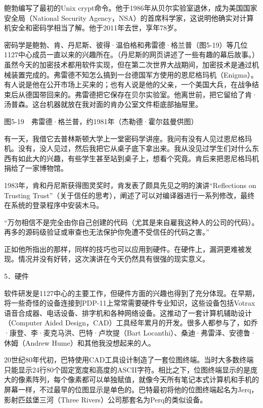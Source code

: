 \documentclass[a4paper,12pt,UTF8,twoside]{ctexbook}
\begin{document}
{{鲍勃编写了最初的Unix crypt命令。他于1986年从贝尔实验室退休，成为美国国家安全局（National Security Agency，NSA）的首席科学家，这说明他确实对计算机安全和密码学相当了解。他于2011年去世，享年78岁。

密码学是鲍勃、肯、丹尼斯、彼得·温伯格和弗雷德·格兰普（图5-19）等几位1127中心成员一直以来的兴趣所在。（丹尼斯的网页讲述了一些有趣的幕后故事。）虽然今天的加密技术都用软件实现，但在第二次世界大战期间，加密技术是通过机械装置完成的。弗雷德不知怎么搞到一台德国军方使用的恩尼格玛机（Enigma）。有人说是他在公开市场上买来的；也有人说是他的父亲，一个美国大兵，在战争结束后从德国带回来的。弗雷德把它保存在贝尔实验室。他离世前，把它留给了肯·汤普森。这台机器就放在我对面的肯办公室文件柜底部抽屉里。



图5-19　弗雷德·格兰普，约1981年（杰勒德·霍尔兹曼供图）

有一天，我借它去普林斯顿大学上一堂密码学讲座。我问有没有人见过恩尼格玛机。没有，没人见过，然后我把它从桌子底下拿出来。我从没见过学生们对什么东西有如此大的兴趣，有些学生甚至站到桌子上，想看个究竟。肯后来把恩尼格玛机捐给了一家博物馆。

1983年，肯和丹尼斯获得图灵奖时，肯发表了颇具先见之明的演讲“Reflections on Trusting Trust”（关于信任的思考），阐述了可以对编译器进行一系列修改，最终在系统的登录程序中安装木马。

“万勿相信不是完全由你自己创建的代码（尤其是来自雇我这种人的公司的代码）。再多的源码级验证或审查也无法保护你免遭不受信任的代码之害。”



正如他所指出的那样，同样的技巧也可以应用到硬件。在硬件上，漏洞更难被发现。情况并没有好转，这次演讲在今天仍然具有很强的现实意义。





5．硬件


软件研发是1127中心的主要工作，但硬件方面的兴趣也得到了充分体现。在早期，将一些奇怪的设备连接到PDP-11上常常需要硬件专业知识，这些设备包括Votrax语音合成器、电话设备、排字机和各种网络设备。这推动了一套计算机辅助设计（Computer Aided Design，CAD）工具经年累月的开发。很多人都参与了，如乔·康登、李·麦克马洪、巴特·卢坎提（Bart Locanthi）、桑迪·弗雷泽、安德鲁·休姆（Andrew Hume）和其他我没想起来的人。

20世纪80年代初，巴特使用CAD工具设计制造了一套位图终端。当时大多数终端只能显示24行80个固定宽度和高度的ASCII字符。相比之下，位图终端显示的是庞大的像素阵列，每个像素都可以单独赋值，就像今天所有笔记本式计算机和手机的屏幕一样，不过最早的位图显示是单色的。巴特最初将他的位图终端起名为Jerq，影射匹兹堡三河（Three Rivers）公司那套名为Perq的类似设备。

}}
\end{document}
